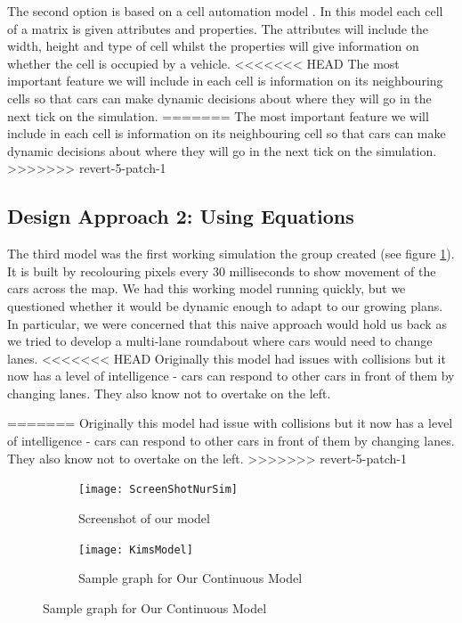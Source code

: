 \documentclass[11pt]{article}
\begin{document}
	The second option is based on a cell automation model \cite{namekawa2005general}. 
	In this model each cell of a matrix is given attributes and properties. 
	The attributes will include the width, height and type of cell whilst the properties will give information on whether the cell is occupied by a vehicle. 
<<<<<<< HEAD
	The most important feature we will include in each cell is information on its neighbouring cells so that cars can make dynamic decisions about where they will go in the next tick on the simulation.
=======
	The most important feature we will include in each cell is information on its neighbouring cell so that cars can make dynamic decisions about where they will go in the next tick on the simulation.
>>>>>>> revert-5-patch-1
	
	
	\subsection{Design Approach 2: Using Equations}
	\FloatBarrier
	
	
    The third model was the first working simulation the group created (see figure \ref{NurScreenshot}). 
    It is built by recolouring pixels every 30 milliseconds to show movement of the cars across the map. 
    We had this working model running quickly, but we questioned whether it would be dynamic enough to adapt to our growing plans. 
    In particular, we were concerned that this naive approach would hold us back as we tried to develop a multi-lane roundabout where cars would need to change lanes. 
<<<<<<< HEAD
    Originally this model had issues with collisions but it now has a level of intelligence - cars can respond to other cars in front of them by changing lanes. 
    They also know not to overtake on the left. 	
    
=======
    Originally this model had issue with collisions but it now has a level of intelligence - cars can respond to other cars in front of them by changing lanes. 
    They also know not to overtake on the left. 	
>>>>>>> revert-5-patch-1
\begin{figure}
	
	\centering
	\begin{subfigure}{.35\textwidth}
		\centering
		\texttt{[image: ScreenShotNurSim]}
		\caption{Screenshot of  our model }
		\label{NurScreenshot}
	\end{subfigure}
	\begin{subfigure}{.35\textwidth}
		\centering
		\texttt{[image: KimsModel]}
		\caption{Sample graph for Our Continuous Model}
		\label{KimModel}
	\end{subfigure}
\end{figure}	
%		
\end{document}
